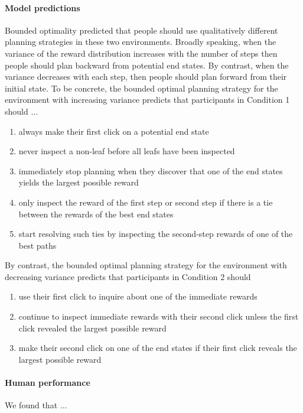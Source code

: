 \paragraph{Model predictions}
Bounded optimality predicted that people should use qualitatively different planning strategies in these two environments. Broadly speaking, when the variance of the reward distribution increases with the number of steps then people should plan backward from potential end states. By contrast, when the variance decreases with each step, then people should plan forward from their initial state. To be concrete, the bounded optimal planning strategy for the environment with increasing variance predicts that participants in Condition 1 should ...
\begin{enumerate}
    \item always make their first click on a potential end state
    \item never inspect a non-leaf before all leafs have been inspected
    \item immediately stop planning when they discover that one of the end states yields the largest possible reward
    \item only inspect the reward of the first step or second step if there is a tie between the rewards of the best end states
    \item start resolving such ties by inspecting the second-step rewards of one of the best paths
\end{enumerate}
By contrast, the bounded optimal planning strategy for the environment with decreasing variance predicts that participants in Condition 2 should
\begin{enumerate}
    \item use their first click to inquire about one of the immediate rewards
    \item continue to inspect immediate rewards with their second click unless the first click revealed the largest possible reward
    \item make their second click on one of the end states if their first click reveals the largest possible reward
\end{enumerate}

\paragraph{Human performance}

We found that ...

